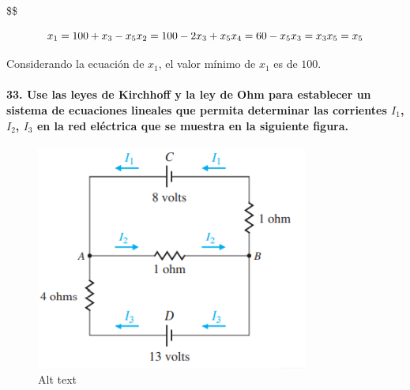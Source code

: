 \documentclass[
]{article}
\begin{document}
\$\$

\[
x_1 = 100 + x_3 - x_5\\
x_2 = 100 - 2x_3 + x_5\\
x_4 = 60 - x_5\\
x_3 = x_3
x_5 = x_5
\]

Considerando la ecuación de \(x_1\), el valor mínimo de \(x_1\) es de
\(100\).

\hypertarget{use-las-leyes-de-kirchhoff-y-la-ley-de-ohm-para-establecer-un-sistema-de-ecuaciones-lineales-que-permita-determinar-las-corrientes-i_1-i_2-i_3-en-la-red-eluxe9ctrica-que-se-muestra-en-la-siguiente-figura.}{%
\paragraph{\texorpdfstring{33. Use las leyes de Kirchhoff y la ley de
Ohm para establecer un sistema de ecuaciones lineales que permita
determinar las corrientes \(I_1\), \(I_2\), \(I_3\) en la red eléctrica
que se muestra en la siguiente
figura.}{33. Use las leyes de Kirchhoff y la ley de Ohm para establecer un sistema de ecuaciones lineales que permita determinar las corrientes I\_1, I\_2, I\_3 en la red eléctrica que se muestra en la siguiente figura.}}\label{use-las-leyes-de-kirchhoff-y-la-ley-de-ohm-para-establecer-un-sistema-de-ecuaciones-lineales-que-permita-determinar-las-corrientes-i_1-i_2-i_3-en-la-red-eluxe9ctrica-que-se-muestra-en-la-siguiente-figura.}}

\begin{figure}
\centering
\includegraphics{image-1.png}
\caption{Alt text}
\end{figure}
\end{document}
